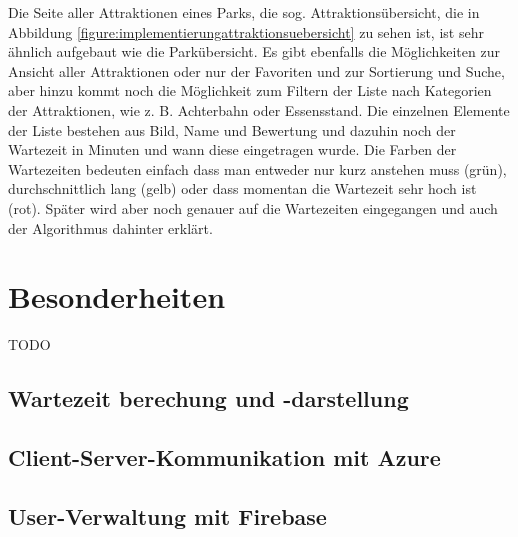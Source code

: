 Die Seite aller Attraktionen eines Parks, die sog. Attraktionsübersicht, die in Abbildung \ref{figure:implementierungattraktionsuebersicht} zu sehen ist, ist sehr ähnlich aufgebaut wie die Parkübersicht. Es gibt ebenfalls die Möglichkeiten zur Ansicht aller Attraktionen oder nur der Favoriten und zur Sortierung und Suche, aber hinzu kommt noch die Möglichkeit zum Filtern der Liste nach Kategorien der Attraktionen, wie z. B. Achterbahn oder Essensstand. Die einzelnen Elemente der Liste bestehen aus Bild, Name und Bewertung und dazuhin noch der Wartezeit in Minuten und wann diese eingetragen wurde. Die Farben der Wartezeiten bedeuten einfach dass man entweder nur kurz anstehen muss (grün), durchschnittlich lang (gelb) oder dass momentan die Wartezeit sehr hoch ist (rot). Später wird aber noch genauer auf die Wartezeiten eingegangen und auch der Algorithmus dahinter erklärt. 




























\section{Besonderheiten}
\label{sec:implementierung:besonderheiten}

TODO

\subsection{Wartezeit berechung und -darstellung}
\label{sec:implementierung:besonderheiten:wartezeit}

\subsection{Client-Server-Kommunikation mit Azure}
\label{sec:implementierung:besonderheiten:azure}


\subsection{User-Verwaltung mit Firebase}
\label{sec:implementierung:besonderheiten:firebase}

